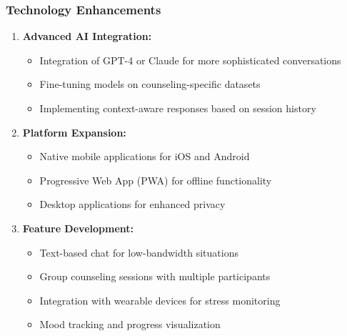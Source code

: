 \documentclass[11pt,a4paper]{article}
\begin{document}
\subsubsection{Technology Enhancements}
\begin{enumerate}
    \item \textbf{Advanced AI Integration:}
    \begin{itemize}
        \item Integration of GPT-4 or Claude for more sophisticated conversations
        \item Fine-tuning models on counseling-specific datasets
        \item Implementing context-aware responses based on session history
    \end{itemize}
    
    \item \textbf{Platform Expansion:}
    \begin{itemize}
        \item Native mobile applications for iOS and Android
        \item Progressive Web App (PWA) for offline functionality
        \item Desktop applications for enhanced privacy
    \end{itemize}
    
    \item \textbf{Feature Development:}
    \begin{itemize}
        \item Text-based chat for low-bandwidth situations
        \item Group counseling sessions with multiple participants
        \item Integration with wearable devices for stress monitoring
        \item Mood tracking and progress visualization
    \end{itemize}
\end{enumerate}
\end{document}
